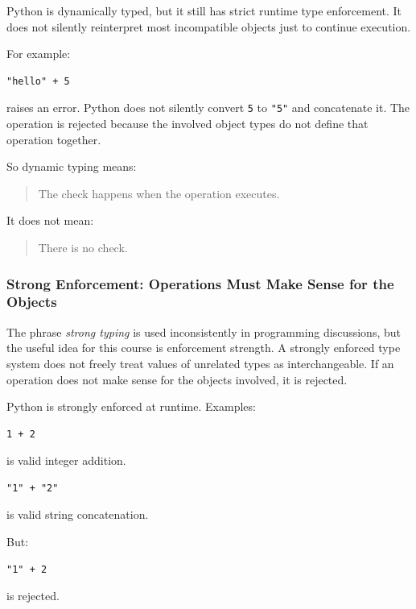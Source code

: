 Python is dynamically typed, but it still has strict runtime type enforcement. It does not silently reinterpret most incompatible objects just to continue execution.

For example:

\begin{verbatim}
"hello" + 5
\end{verbatim}

raises an error. Python does not silently convert \texttt{5} to \texttt{"5"} and concatenate it. The operation is rejected because the involved object types do not define that operation together.

So dynamic typing means:

\begin{quote}
The check happens when the operation executes.
\end{quote}

It does not mean:

\begin{quote}
There is no check.
\end{quote}

\subsubsection*{Strong Enforcement: Operations Must Make Sense for the Objects}

The phrase \emph{strong typing} is used inconsistently in programming discussions, but the useful idea for this course is enforcement strength. A strongly enforced type system does not freely treat values of unrelated types as interchangeable. If an operation does not make sense for the objects involved, it is rejected.

Python is strongly enforced at runtime. Examples:

\begin{verbatim}
1 + 2
\end{verbatim}

is valid integer addition.

\begin{verbatim}
"1" + "2"
\end{verbatim}

is valid string concatenation.

But:

\begin{verbatim}
"1" + 2
\end{verbatim}

is rejected.

